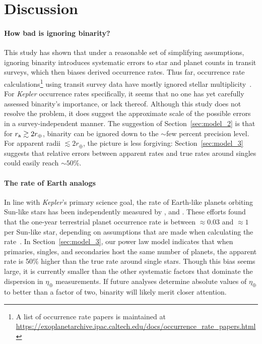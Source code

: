 \documentclass[12pt,modern]{aastex61}
\renewcommand{\a}{_{\rm a}}
\begin{document}
%

\section{Discussion}
\label{sec:discussion}


\paragraph{How bad is ignoring binarity?}
This study has shown that under a reasonable set of simplifying assumptions, 
ignoring binarity introduces systematic errors to star and planet counts in 
transit surveys, which then biases derived occurrence rates.
Thus far, occurrence rate calculations\footnote{
    A list of occurrence rate papers is maintained at 
    \url{https://exoplanetarchive.ipac.caltech.edu/docs/occurrence_rate_papers.html}
} using transit survey data have mostly ignored stellar 
multiplicity~\citep[\textit{e.g.},][]{howard_planet_2012,fressin_false_2013,foreman-mackey_exoplanet_2014,dressing_occurrence_2015,burke_terrestrial_2015}.
For {\it Kepler} occurrence rates specifically, 
it seems that no one has yet carefully assessed binarity's importance, or lack 
thereof.
Although this study does not resolve the problem, it does suggest the 
approximate scale of the possible errors in a survey-independent manner.
The suggestion of Section~\ref{sec:model_2} is that for $r\a \gtrsim 2r_\oplus$, 
binarity can be ignored down to the $\sim$few percent precision level.
For apparent radii $\lesssim 2r_\oplus$, the picture is less forgiving:
Section~\ref{sec:model_3} suggests that relative errors between apparent rates 
and true rates around singles could easily reach $\sim\! 50\%$.

\paragraph{The rate of Earth analogs}
In line with {\it Kepler}'s primary science goal, the rate of Earth-like 
planets orbiting Sun-like stars has been independently measured by 
\citet{youdin_exoplanet_2011,petigura_prevalence_2013,dong_fast_2013,
    foreman-mackey_exoplanet_2014}, and \citet{burke_terrestrial_2015}.
These efforts found that the one-year terrestrial planet occurrence rate 
is between $\approx\! 0.03$ and $\approx\!1$ per Sun-like star,
depending on assumptions that are made when calculating the
rate~\citep[see][, Figure~17]{burke_terrestrial_2015}.
In Section~\ref{sec:model_3}, our power law model indicates that when primaries, 
singles, and secondaries host the same number of planets, the apparent rate is 
50\% higher than the true rate around single stars.
Though this bias seems large, it is currently smaller than the other 
systematic factors that dominate the dispersion in $\eta_\oplus$ 
measurements.
If future analyses determine absolute values of $\eta_\oplus$ to 
better than a factor of two, binarity will likely merit closer attention.
\end{document}
